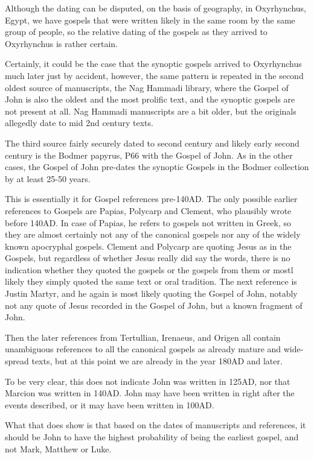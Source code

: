 Although the dating can be disputed, on the basis of geography, in Oxyrhynchus, Egypt, we have gospels that were written likely in the same room by the same group of people, so the relative dating of the gospels as they arrived to Oxyrhynchus is rather certain.

Certainly, it could be the case that the synoptic gospels arrived to Oxyrhynchus much later just by accident, however, the same pattern is repeated in the second oldest source of manuscripts, the Nag Hammadi library, where the Gospel of John is also the oldest and the most prolific text, and the synoptic gospels are not present at all.
Nag Hammadi manuscripts are a bit older, but the originals allegedly date to mid 2nd century texts.

The third source fairly securely dated to second century and likely early second century is the Bodmer papyrus, P66 with the Gospel of John.
As in the other cases, the Gospel of John pre-dates the synoptic Gospels in the Bodmer collection by at least 25-50 years.

This is essentially it for Gospel references pre-140AD.
The only possible earlier references to Gospels are Papias, Polycarp and Clement, who plausibly wrote before 140AD.
In case of Papias, he refers to gospels not written in Greek, so they are almost certainly not any of the canonical gospels nor any of the widely known apocryphal gospels.
Clement and Polycarp are quoting Jesus as in the Gospels, but regardless of whether Jesus really did say the words, there is no indication whether they quoted the gospels or the gospels from them or mostl likely they simply quoted the same text or oral tradition.
The next reference is Justin Martyr, and he again is most likely quoting the Gospel of John, notably not any quote of Jesus recorded in the Gospel of John, but a known fragment of John.

Then the later references from Tertullian, Irenaeus, and Origen all contain unambiguous references to all the canonical gospels as already mature and wide-spread texts, but at this point we are already in the year 180AD and later.

To be very clear, this does not indicate John was written in 125AD, nor that Marcion was written in 140AD.
John may have been written in right after the events described, or it may have been written in 100AD.

What that does show is that based on the dates of manuscripts and references, it should be John to have the highest probability of being the earliest gospel, and not Mark, Matthew or Luke.

